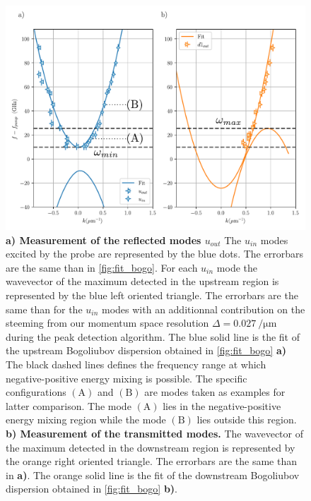 \begin{figure}
    \centering
    \includegraphics[width=1\textwidth]{chap_stimulated_hawking/fig/fit_bogo_RT.pdf}
    \caption{\textbf{a) Measurement of the reflected modes $u_{out}$} The $u_{in}$ modes excited by the probe are represented by the blue dots. The errorbars are the same than in \autoref{fig:fit_bogo}. For each $u_{in}$ mode
    the wavevector of the maximum detected in the upstream region is represented by the blue left oriented triangle. The errorbars are the same than for the $u_{in}$ modes with an additionnal contribution on the steeming from our momentum space resolution $\Delta=\SI{0.027}{\per \micro \meter}$ during the peak detection algorithm. The blue solid line
    is the fit of the upstream Bogoliubov dispersion obtained in \autoref{fig:fit_bogo} \textbf{a)} The black dashed lines defines the frequency range 
    at which negative-positive energy mixing is possible. The specific configurations $\mathrm{(A)}$ and $\mathrm{(B)}$ are modes taken as examples for latter comparison. The mode $\mathrm{(A)}$ lies in the negative-positive energy mixing region while the mode $\mathrm{(B)}$ lies outside this region.
    \textbf{b) Measurement of the transmitted modes.} The wavevector of the maximum detected in the downstream region is represented by the orange right oriented triangle. The errorbars are the same than in \textbf{a)}. 
    The orange solid line is the fit of the downstream Bogoliubov dispersion obtained in \autoref{fig:fit_bogo} \textbf{b)}. }
    \label{fig:fit_bogo_RT}
\end{figure}

